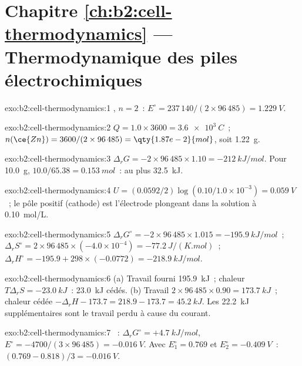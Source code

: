 \section*{Chapitre \ref{ch:b2:cell-thermodynamics} --- Thermodynamique des piles électrochimiques}

\begin{solution}{exo:b2:cell-thermodynamics:1}
, $n = 2$~: $E^\circ = 237\,140/(2 \times 96\,485) =
\qty{1.229}{V}$.
\end{solution}

\begin{solution}{exo:b2:cell-thermodynamics:2}
$Q = 1.0 \times 3600 = \qty{3.6e3}{C}$~; $n(\ce{Zn}) = 3600/(2 \times 96\,485) =
\qty{1.87e-2}{mol}$, soit \qty{1.22}{g}.
\end{solution}

\begin{solution}{exo:b2:cell-thermodynamics:3}
$\Delta_r G = -2 \times 96\,485 \times 1.10 = \qty{-212}{kJ/mol}$. Pour
\qty{10.0}{g}, $10.0/65.38 = \qty{0.153}{mol}$~: au plus \qty{32.5}{kJ}.
\end{solution}

\begin{solution}{exo:b2:cell-thermodynamics:4}
$U = (0.0592/2)\log(0.10/1.0 \times 10^{-3}) = \qty{0.059}{V}$~; le pôle positif
(cathode) est l'électrode plongeant dans la solution à \qty{0.10}{mol/L}.
\end{solution}

\begin{solution}{exo:b2:cell-thermodynamics:5}
$\Delta_r G^\circ = -2 \times 96\,485 \times 1.015 = \qty{-195.9}{kJ/mol}$~;
$\Delta_r S^\circ = 2 \times 96\,485 \times (-4.0 \times 10^{-4}) =
\qty{-77.2}{J/(K.mol)}$~; $\Delta_r H^\circ = -195.9 + 298 \times (-0.0772) =
\qty{-218.9}{kJ/mol}$.
\end{solution}

\begin{solution}{exo:b2:cell-thermodynamics:6}
(a) Travail fourni \qty{195.9}{kJ}~; chaleur $T\Delta_r S = \qty{-23.0}{kJ}$~: \qty{23.0}{kJ}
cédés. (b) Travail $2 \times 96\,485 \times 0.90 = \qty{173.7}{kJ}$~; chaleur cédée
$-\Delta_r H - 173.7 = 218.9 - 173.7 = \qty{45.2}{kJ}$. Les
\qty{22.2}{kJ} supplémentaires sont le travail perdu à cause du courant.
\end{solution}

\begin{solution}{exo:b2:cell-thermodynamics:7}
~: $\Delta_r G^\circ = +\qty{4.7}{kJ/mol}$, $E^\circ =
-4700/(3 \times 96\,485) = \qty{-0.016}{V}$. Avec $E_1^\circ = 0.769$ et
$E_2^\circ = \qty{-0.409}{V}$~: $(0.769 - 0.818)/3 = \qty{-0.016}{V}$.
\end{solution}

